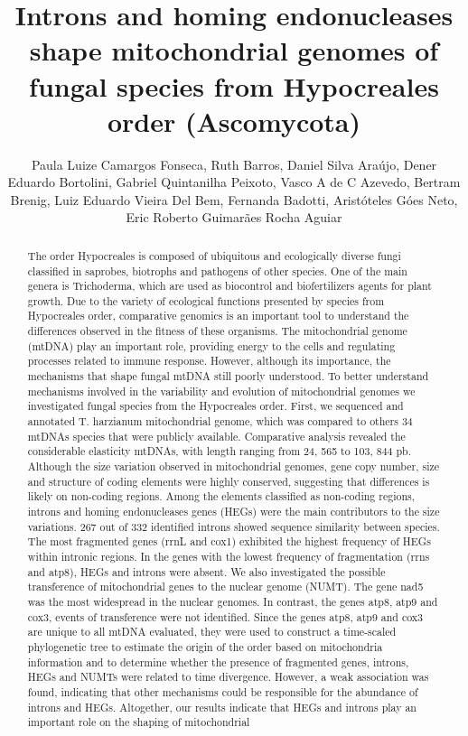 \documentclass[twoside]{article}
\title{\vspace{-15mm}\fontsize{24pt}{10pt}\selectfont\textbf{ Introns and homing endonucleases shape mitochondrial genomes of fungal species from Hypocreales order (Ascomycota) }} %
\author{ Paula Luize Camargos Fonseca, Ruth Barros, Daniel Silva Ara\'ujo, Dener Eduardo Bortolini, Gabriel Quintanilha Peixoto, Vasco A de C Azevedo, Bertram Brenig, Luiz Eduardo Vieira Del Bem, Fernanda Badotti, Arist\'oteles G\'oes Neto, Eric Roberto Guimar\~aes Rocha Aguiar }
\affil{ University G\"ottingen }
\date{}
\begin{document}
  
  
  \maketitle %
  
  
  \thispagestyle{fancy} %
  
  
  \begin{abstract}
  The order Hypocreales is composed of ubiquitous and ecologically diverse fungi classified in saprobes,  biotrophs and pathogens of other species. One of the main genera is Trichoderma,  which are used as biocontrol and biofertilizers agents for plant growth. Due to the variety of ecological functions presented by species from Hypocreales order,  comparative genomics is an important tool to understand the differences observed in the fitness of these organisms. The mitochondrial genome (mtDNA) play an important role,  providing energy to the cells and regulating processes related to immune response. However,  although its importance,  the mechanisms that shape fungal mtDNA still poorly understood. To better understand mechanisms involved in the variability and evolution of mitochondrial genomes we investigated fungal species from the Hypocreales order. First,  we sequenced and annotated T. harzianum mitochondrial genome,  which was compared to others 34 mtDNAs species that were publicly available. Comparative analysis revealed the considerable elasticity mtDNAs,  with length ranging from 24, 565 to 103, 844 pb. Although the size variation observed in mitochondrial genomes,  gene copy number,  size and structure of coding elements were highly conserved,  suggesting that differences is likely on non-coding regions. Among the elements classified as non-coding regions,  introns and homing endonucleases genes (HEGs) were the main contributors to the size variations. 267 out of 332 identified introns showed sequence similarity between species. The most fragmented genes (rrnL and cox1) exhibited the highest frequency of HEGs within intronic regions. In the genes with the lowest frequency of fragmentation (rrns and atp8),  HEGs and introns were absent. We also investigated the possible transference of mitochondrial genes to the nuclear genome (NUMT). The gene nad5 was the most widespread in the nuclear genomes. In contrast,  the genes atp8,  atp9 and cox3,  events of transference were not identified. Since the genes atp8,  atp9 and cox3 are unique to all mtDNA evaluated,  they were used to construct a time-scaled phylogenetic tree to estimate the origin of the order based on mitochondria information and to determine whether the presence of fragmented genes,  introns,  HEGs and NUMTs were related to time divergence. However,  a weak association was found,  indicating that other mechanisms could be responsible for the abundance of introns and HEGs. Altogether,  our results indicate that HEGs and introns play an important role on the shaping of mitochondrial 
\end{abstract}
\end{document}

